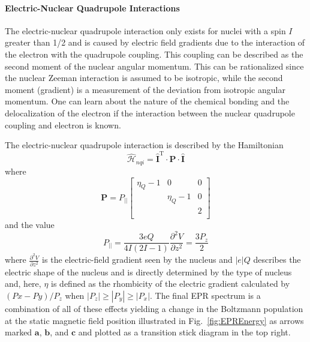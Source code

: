 \paragraph*{Electric-Nuclear Quadrupole Interactions}
The electric-nuclear quadrupole interaction only exists for nuclei with a spin $I$ greater than 1/2 and is caused by electric field gradients due to the interaction of the electron with the quadrupole coupling. This coupling can be described as the second moment of the nuclear angular momentum. This can be rationalized since the nuclear Zeeman interaction is assumed to be isotropic, while the second moment (gradient) is a measurement of the deviation from isotropic angular momentum.\cite{griffith1964theory} One can learn about the nature of the chemical bonding and the delocalization of the electron if the interaction between the nuclear quadrupole coupling and electron is known.\cite{quadref} 

The electric-nuclear quadrupole interaction is described by the Hamiltonian
\begin{equation}
    \hat{\mathcal{H}}_{nqi} = \mathbf{\hat{I}}^\text{T} \cdot \mathbf{P} \cdot \mathbf{\hat{I}} \label{eq-2:nqi}
\end{equation}
where
\begin{equation}
    \mathbf{P} = P_{||}   \begin{bmatrix}
   \eta_Q -1 & 0 & 0\\
     & \eta_Q -1 & 0\\
    &   & 2\\
   \end{bmatrix}
\end{equation}
and the value 
\begin{equation}
    P_{||} = \frac{3 e Q}{4I(2I-1)}\frac{\partial^2 V}{\partial z^2} = \frac{3 P_z}{2}
\end{equation}
where $\frac{\partial^2 V}{\partial z^2}$ is the electric-field gradient seen by the nucleus and $|e|Q$ describes the electric shape of the nucleus and is directly determined by the type of nucleus and, here, $\eta$ is defined as the rhombicity of the electric gradient calculated by $(Px-Py)/P_z$ when $|P_z|\geq |P_y|\geq |P_x|$. \cite{abragam2012electron,weil2007electron} The final EPR spectrum is a combination of all of these effects yielding a change in the Boltzmann population at the static magnetic field position illustrated in Fig.~\ref{fig:EPREnergy} as arrows marked $\mathbf{a}$, $\mathbf{b}$, and $\mathbf{c}$ and plotted as a transition stick diagram in the top right.

